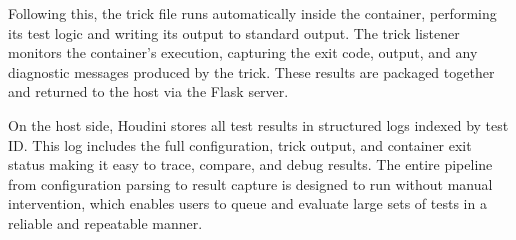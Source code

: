 \documentclass[12pt]{report}
\begin{document}
\begin{doublespace}
Following this, the trick file runs automatically inside the container, performing its test logic and writing its output to standard output. The trick listener monitors the container’s execution, capturing the exit code, output, and any diagnostic messages produced by the trick. These results are packaged together and returned to the host via the Flask server.

On the host side, Houdini stores all test results in structured logs indexed by test ID. This log includes the full configuration, trick output, and container exit status making it easy to trace, compare, and debug results. The entire pipeline from configuration parsing to result capture is designed to run without manual intervention, which enables users to queue and evaluate large sets of tests in a reliable and repeatable manner.

\end{doublespace} 	\fontsize{12pt}{14pt} \selectfont
\end{document}

